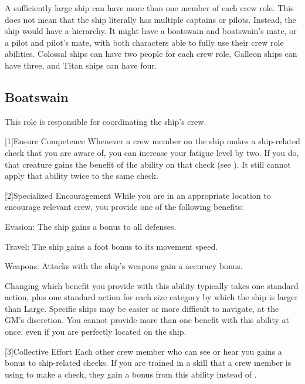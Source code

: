     A sufficiently large ship can have more than one member of each crew role.
    This does not mean that the ship literally has multiple captains or pilots.
    Instead, the ship would have a hierarchy.
    It might have a boatswain and boatswain's mate, or a pilot and pilot's mate, with both characters able to fully use their crew role abilities.
    Colossal ships can have two people for each crew role, Galleon ships can have three, and Titan ships can have four.


    \subsection{Boatswain}
        This role is responsible for coordinating the ship's crew.

        [1]{Ensure Competence} Whenever a crew member on the ship makes a ship-related check that you are aware of, you can increase your fatigue level by two.
        If you do, that creature gains the benefit of the  ability on that check (see ).
        It still cannot apply that ability twice to the same check.

        [2]{Specialized Encouragement} While you are in an appropriate location to encourage relevant crew, you provide one of the following benefits:
        \begin{raggeditemize}
            \item Evasion: The ship gains a  bonus to all defenses.
            \item Travel: The ship gains a  foot bonus to its movement speed.
            \item Weapons: Attacks with the ship's weapons gain a  accuracy bonus.
        \end{raggeditemize}

        Changing which benefit you provide with this ability typically takes one standard action, plus one standard action for each size category by which the ship is larger than Large.
        Specific ships may be easier or more difficult to navigate, at the GM's discretion.
        You cannot provide more than one benefit with this ability at once, even if you are perfectly located on the ship.

        [3]{Collective Effort} Each other crew member who can see or hear you gains a  bonus to ship-related checks.
        If you are trained in a skill that a crew member is using to make a check, they gain a  bonus from this ability instead of .

